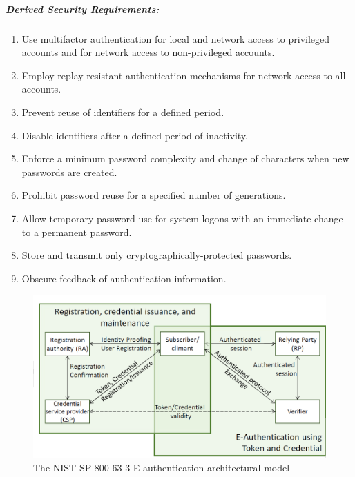\documentclass{article}
\begin{document}
                \subparagraph{Derived Security Requirements:}
                \begin{enumerate}
                    \item Use multifactor authentication for local and network access to privileged accounts and for network access to non-privileged accounts.
                    \item Employ replay-resistant authentication mechanisms for network access to all accounts.
                    \item Prevent reuse of identifiers for a defined period.
                    \item Disable identifiers after a defined period of inactivity.
                    \item Enforce a minimum password complexity and change of characters when new passwords are created.
                    \item Prohibit password reuse for a specified number of generations.
                    \item Allow temporary password use for system logons with an immediate change to a permanent password.
                    \item Store and transmit only cryptographically-protected passwords.
                    \item Obscure feedback of authentication information.
                \end{enumerate}

                \begin{figure}[h]
                    \begin{center}
                        \includegraphics[scale=0.5]{../immagini/Authentication_Model.png}
                    \end{center}
                    \caption{The NIST SP 800-63-3 E-authentication architectural model}
                \end{figure}
\end{document}
